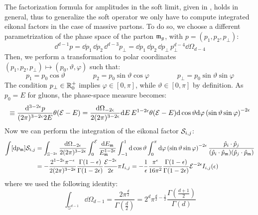 The factorization formula for amplitudes in the soft limit, given in , holds in general, thus to generalize the soft operator we only have to compute integrated eikonal factors in the case of massive partons. To do so, we choose a different parametrization of the phase space of the parton $ \mathfrak{m}_g $, with $ p = (p_1 , p_2 , p_\perp) $:
\begin{equation}
  \dd^{d-1} p = \dd p_1 \, \dd p_2 \, \dd^{d-3} p_\perp = \dd p_1 \, \dd p_2 \, \dd p_\perp \, p_\perp^{d-4} \dd \Omega_{d-4}
\end{equation}
Then, we perform a transformation to polar coordinates $ (p_1 , p_2 , p_\perp) \mapsto (p_0 , \vartheta , \varphi) $ such that:
\begin{equation}
  p_1 = p_0 \cos \vartheta
  \qquad \qquad
  p_2 = p_0 \sin \vartheta \cos \varphi
  \qquad \qquad
  p_\perp = p_0 \sin \vartheta \sin \varphi
\end{equation}
The condition $ p_\perp \in \mathbb{R}^+_0 $ implies $ \varphi \in [0,\pi] $, while $ \vartheta \in [0,\pi] $ by definition. As $ p_0 = E $ for gluons, the phase-space measure becomes:
\begin{equation}
  [\dd p] \equiv \frac{\dd^{3-2\de}p}{(2\pi)^{3-2\de}2E} \theta(\ema - E) = \frac{\dd \Omega_{-2\de}}{2(2\pi)^{3-2\de}} \dd E\, E^{1-2\de} \theta(\ema - E) \dd \cos \vartheta \dd \varphi \left( \sin \vartheta \sin \varphi \right)^{-2\de}
\end{equation}
Now we can perform the integration of the eikonal factor $ \mathcal{S}_{i,j} $:
\begin{equation*}
  \begin{split}
    \int [\mathrm{d} p_{\mathfrak{m}}] \mathcal{S}_{i,j}
    & = \int_{\mathbb{S}^{-2\epsilon}} \frac{\mathrm{d} \Omega_{-2\epsilon}}{2(2\pi)^{3-2\epsilon}} \int_0^{\mathcal{E}} \frac{\mathrm{d} E_{\mathfrak{m}}}{E_{\mathfrak{m}}^{1-2\epsilon}} \int_{-1}^1 \mathrm{d} \cos \vartheta \int_0^\pi \mathrm{d} \varphi \left( \sin \vartheta \sin \varphi \right)^{-2\epsilon} \frac{\hat{p}_i \cdot \hat{p}_j}{(\hat{p}_i \cdot \hat{p}_{\mathfrak{m}}) (\hat{p}_j \cdot \hat{p}_{\mathfrak{m}})} \\
    & = - \frac{2^{1-2\epsilon} \pi^{-\epsilon}}{2(2\pi)^{3-2\epsilon}} \frac{\Gamma(1-\epsilon)}{\Gamma(1-2\epsilon)} \frac{\mathcal{E}^{-2\epsilon}}{2\epsilon} \pi I_{i,j} = - \frac{1}{\epsilon} \frac{\pi^\epsilon}{16\pi^2} \frac{\Gamma(1-\epsilon)}{\Gamma(1-2\epsilon)} \mathcal{E}^{-2\epsilon} I_{i,j}(\epsilon)
  \end{split}
\end{equation*}
where we used the following identity:
\begin{equation}
  \int_{\mathbb{S}^{d-1}} \dd \Omega_{d-1} = \frac{2 \pi^{\frac{d}{2}}}{\Gamma(\frac{d}{2})} = 2^d \pi^{\frac{d}{2} - \frac{1}{2}} \frac{\Gamma\left( \frac{d+1}{2} \right)}{\Gamma(d)}
\end{equation}
